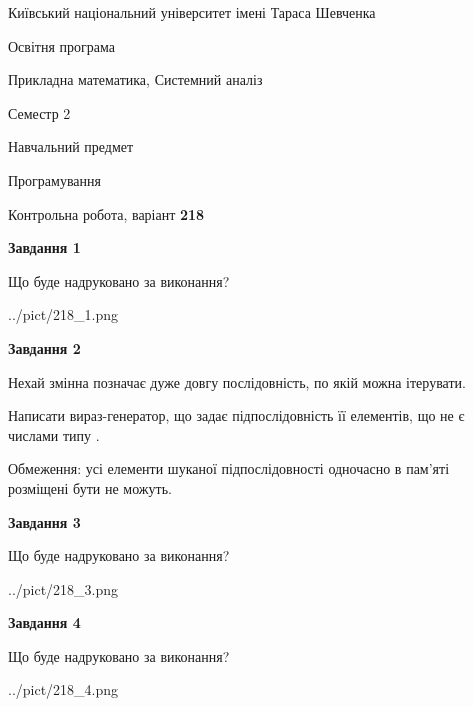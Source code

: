 \documentclass[12pt, ukrainian]{article}
\begin{document}
{{\begin {small}\par
{ \center  Київський національний університет імені Тараса Шевченка \par}
{\parbox {5 cm}{Освітня програма \hfill}{\parbox {8 cm}{Прикладна математика, Системний аналіз \hfill}}\parbox {5 cm}{\hfill Семестр 2}}\par
{\parbox {5 cm} {Навчальний предмет \hfill}\parbox {7 cm}{Програмування \hfill}\parbox {6cm}{\hfill}\par}\vspace{-7pt} \end{small}}{\center Контрольна робота, варіант  \No \textbf
{ 218 }\par}}
{
\begin {large}
{\begin {center}\textbf{Завдання 1}\end {center}}\par
Що буде надруковано за виконання?\par\par
\begin{center}
	{../pict/218_1.png}
\end{center}
\newpage

{\begin {center}\textbf{Завдання 2}\end {center}}\par
Нехай змінна  позначає дуже довгу послідовність, по якій можна ітерувати.

Написати вираз-генератор, що задає підпослідовність її елементів, що не є числами типу .

Обмеження: усі елементи шуканої підпослідовності одночасно в пам'яті розміщені бути не можуть.\par
\newpage

{\begin {center}\textbf{Завдання 3}\end {center}}\par
Що буде надруковано за виконання?\par
\begin{center}
	{../pict/218_3.png}
\end{center}
\newpage

{\begin {center}\textbf{Завдання 4}\end {center}}\par
Що буде надруковано за виконання?\par
\begin{center}
	{../pict/218_4.png}
\end{center}
\newpage


\end{large}}
\end{document}
